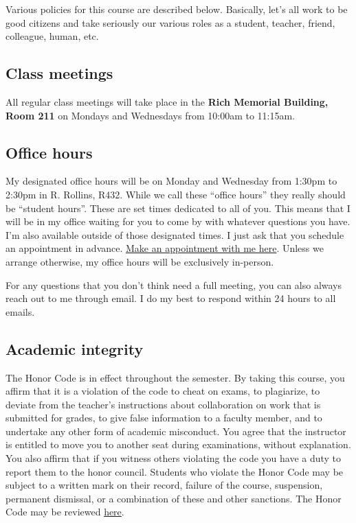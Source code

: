 \documentclass[11pt,]{article}
\begin{document}
Various policies for this course are described below. Basically, let's
all work to be good citizens and take seriously our various roles as a
student, teacher, friend, colleague, human, etc.

\hypertarget{class-meetings}{%
\subsection{Class meetings}\label{class-meetings}}

All regular class meetings will take place in the \textbf{Rich Memorial
Building, Room 211} on Mondays and Wednesdays from 10:00am to 11:15am.

\hypertarget{office-hours}{%
\subsection{Office hours}\label{office-hours}}

My designated office hours will be on Monday and Wednesday from 1:30pm
to 2:30pm in R. Rollins, R432. While we call these ``office hours'' they
really should be ``student hours''. These are set times dedicated to all
of you. This means that I will be in my office waiting for you to come
by with whatever questions you have. I'm also available outside of those
designated times. I just ask that you schedule an appointment in
advance. \href{https://mccarthy-meetings.youcanbook.me/}{Make an
appointment with me here}. Unless we arrange otherwise, my office hours
will be exclusively in-person.

For any questions that you don't think need a full meeting, you can also
always reach out to me through email. I do my best to respond within 24
hours to all emails.

\hypertarget{academic-integrity}{%
\subsection{Academic integrity}\label{academic-integrity}}

The Honor Code is in effect throughout the semester. By taking this
course, you affirm that it is a violation of the code to cheat on exams,
to plagiarize, to deviate from the teacher's instructions about
collaboration on work that is submitted for grades, to give false
information to a faculty member, and to undertake any other form of
academic misconduct. You agree that the instructor is entitled to move
you to another seat during examinations, without explanation. You also
affirm that if you witness others violating the code you have a duty to
report them to the honor council. Students who violate the Honor Code
may be subject to a written mark on their record, failure of the course,
suspension, permanent dismissal, or a combination of these and other
sanctions. The Honor Code may be reviewed
\href{http://catalog.college.emory.edu/academic/policies-regulations/honor-code.html}{here}.
\end{document}
